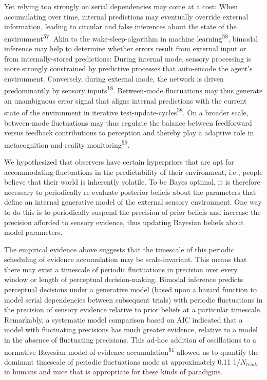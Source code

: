\documentclass[
]{article}
\begin{document}
Yet relying too strongly on serial dependencies may come at a cost: When
accumulating over time, internal predictions may eventually override
external information, leading to circular and false inferences about the
state of the environment\textsuperscript{57}. Akin to the
wake-sleep-algorithm in machine learning\textsuperscript{58}, bimodal
inference may help to determine whether errors result from external
input or from internally-stored predictions: During internal mode,
sensory processing is more strongly constrained by predictive processes
that auto-encode the agent's environment. Conversely, during external
mode, the network is driven predominantly by sensory
inputs\textsuperscript{18}. Between-mode fluctuations may thus generate
an unambiguous error signal that aligns internal predictions with the
current state of the environment in iterative
test-update-cycles\textsuperscript{58}. On a broader scale, between-mode
fluctuations may thus regulate the balance between feedforward versus
feedback contributions to perception and thereby play a adaptive role in
metacognition and reality monitoring\textsuperscript{59}.

We hypothesized that observers have certain hyperpriors that are apt for
accommodating fluctuations in the predictability of their environment,
i.e., people believe that their world is inherently volatile. To be
Bayes optimal, it is therefore necessary to periodically re-evaluate
posterior beliefs about the parameters that define an internal
generative model of the external sensory environment. One way to do this
is to periodically suspend the precision of prior beliefs and increase
the precision afforded to sensory evidence, thus updating Bayesian
beliefs about model parameters.

The empirical evidence above suggests that the timescale of this
periodic scheduling of evidence accumulation may be scale-invariant.
This means that there may exist a timescale of periodic fluctuations in
precision over every window or length of perceptual decision-making.
Bimodal inference predicts perceptual decisions under a generative model
(based upon a hazard function to model serial dependencies between
subsequent trials) with periodic fluctuations in the precision of
sensory evidence relative to prior beliefs at a particular timescale.
Remarkably, a systematic model comparison based on AIC indicated that a
model with fluctuating precisions has much greater evidence, relative to
a model in the absence of fluctuating precisions. This ad-hoc addition
of oscillations to a normative Bayesian model of evidence
accumulation\textsuperscript{51} allowed us to quantify the dominant
timescale of periodic fluctuations mode at approximately 0.11
1/\(N_{trials}\) in humans and mice that is appropriate for these kinds
of paradigms.
\end{document}
